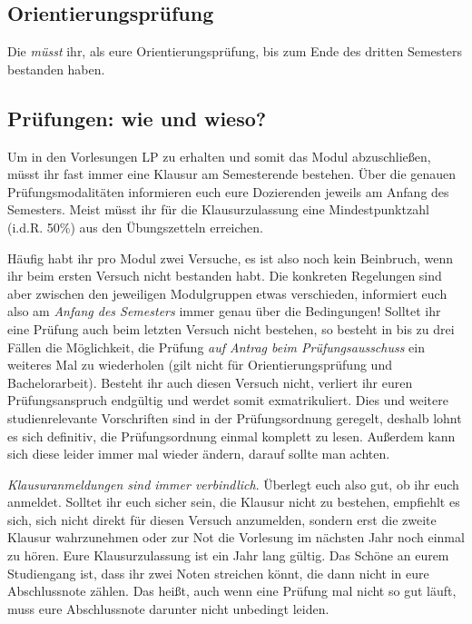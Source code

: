 \subsection{Orientierungsprüfung}

Die  \emph{müsst} ihr, als eure Orientierungsprüfung, bis zum Ende des dritten Semesters bestanden haben.


\subsection{Prüfungen: wie und wieso?}

Um in den Vorlesungen \gls{LP} zu erhalten und somit das Modul abzuschließen, müsst ihr fast immer eine Klausur am Semesterende bestehen. Über die genauen Prüfungsmodalitäten informieren euch eure Dozierenden jeweils am Anfang des Semesters. Meist müsst ihr für die Klausurzulassung eine Mindestpunktzahl (i.d.R. 50\%) aus den Übungszetteln erreichen.

Häufig habt ihr pro Modul zwei Versuche, es ist also noch kein Beinbruch, wenn ihr beim ersten Versuch nicht bestanden habt. Die konkreten Regelungen sind aber zwischen den jeweiligen Modulgruppen etwas verschieden, informiert euch also am \emph{Anfang des Semesters} immer genau über die Bedingungen! Solltet ihr eine Prüfung auch beim letzten Versuch nicht bestehen, so besteht in bis zu drei Fällen die Möglichkeit, die Prüfung \emph{auf Antrag beim Prüfungsausschuss} ein weiteres Mal zu wiederholen (gilt nicht für Orientierungsprüfung und Bachelorarbeit). Besteht ihr auch diesen Versuch nicht, verliert ihr euren Prüfungsanspruch endgültig und werdet somit exmatrikuliert. Dies und weitere studienrelevante Vorschriften sind in der Prüfungsordnung geregelt, deshalb lohnt es sich definitiv, die Prüfungsordnung einmal komplett zu lesen. Außerdem kann sich diese leider immer mal wieder ändern, darauf sollte man achten.

\emph{Klausuranmeldungen sind immer verbindlich}. Überlegt euch also gut, ob ihr euch anmeldet. Solltet ihr euch sicher sein, die Klausur nicht zu bestehen, empfiehlt es sich, sich nicht direkt für diesen Versuch anzumelden, sondern erst die zweite Klausur wahrzunehmen oder zur Not die Vorlesung im nächsten Jahr noch einmal zu hören. Eure Klausurzulassung ist ein Jahr lang gültig. Das Schöne an eurem Studiengang ist, dass ihr zwei Noten streichen könnt, die dann nicht in eure Abschlussnote zählen. Das heißt, auch wenn eine Prüfung mal nicht so gut läuft, muss eure Abschlussnote darunter nicht unbedingt leiden.

